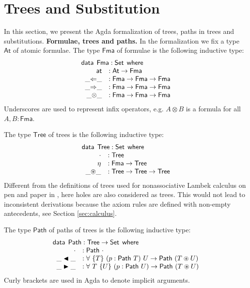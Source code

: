\documentclass[runningheads]{llncs}
\newcommand{\ot}{\otimes}
\newcommand{\cdast}{\circledast}
\newcommand{\Larr}{\Leftarrow}
\newcommand{\Rarr}{\Rightarrow}
\newcommand{\btleft}{\blacktriangleleft}
\newcommand{\btright}{\blacktriangleright}
\newcommand{\At}{\mathsf{At}}
\newcommand{\at}{\mathsf{at}}
\newcommand{\Fma}{\mathsf{Fma}}
\newcommand{\data}{\mathsf{data}}
\newcommand{\Tree}{\mathsf{Tree}}
\newcommand{\Path}{\mathsf{Path}}
\newcommand{\path}[1]{\mathsf{Path} ~ #1}
\newcommand{\where}{\mathsf{where}}
\newcommand{\Set}{\mathsf{Set}}
\begin{document}
\section{Trees and Substitution}
In this section, we present the Agda formalization of trees, paths in trees and substitutions.
\noindent\textbf{Formulae, trees and paths.} In the formalization we fix a type $\At$ of atomic formulae.
The type $\Fma$ of formulae is the following inductive type:
\[
\begin{array}{rl}
  \multicolumn{2}{l}{\data \:\:  \Fma : \Set \:\: \where} \\
  \;\; \at &: \At \to \Fma \\
  \;\; \_{\Larr}\_ &: \Fma \to \Fma \to \Fma \\ 
  \;\; \_{\Rarr}\_ &: \Fma \to \Fma \to \Fma \\ 
  \;\; \_{\ot}\_ &: \Fma \to \Fma \to \Fma \\
\end{array}
\]
Underscores are used to represent infix operators, e.g. $A \ot B$ is a formula for all $A,B : \Fma$.

The type $\Tree$ of trees is the following inductive type:
\[
\begin{array}{rl}
  \multicolumn{2}{l}{\data \:\:  \Tree : \Set \:\: \where} \\
  \;\; \cdot &: \Tree \\
  \;\; \eta &: \Fma \to \Tree \\
  \;\; \_{\cdast}\_ &: \Tree \to \Tree \to \Tree \\
\end{array}
\]
Different from the definitions of trees used for nonassociative Lambek calculus on pen and paper in \cite{moot:categorial:2012}, here holes are also considered as trees. This would not lead to inconsistent derivations because the axiom rules are defined with non-empty antecedents, see Section \ref{sec:calculus}.

The type $\Path$ of paths of trees is the following inductive type:
\[
\begin{array}{rl}
  \multicolumn{2}{l}{\data \:\:  \Path : \Tree \to \Set \:\: \where} \\
  \;\; \cdot &: \path{\cdot} \\
  \;\; \_\btleft\_ &: \forall ~ \{T\} ~ (p : \path{T}) ~ U \to \path{(T \cdast U)} \\
  \;\; \_\btright\_ &: \forall ~ T ~ \{U\} ~ (p : \path{U}) \to \path{(T \cdast U)}
\end{array}
\]
Curly brackets are used in Agda to denote implicit arguments.
\end{document}
